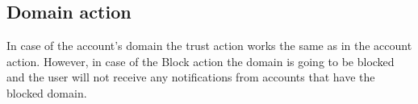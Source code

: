 \subsection{Domain action}
\label{ss:dmn_action}
In case of the account's domain the trust action works the same as in the account action.
However, in case of the Block action the domain is going to be blocked and the user will not
receive any notifications from accounts that have the blocked domain.



